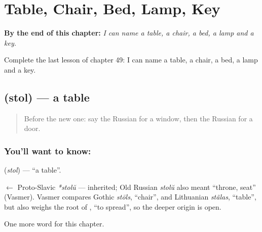 
\chapter{Table, Chair, Bed, Lamp, Key}
\label{ch:ru-table-chair-bed-lamp-key}

\begin{chapteropening}
\textbf{By the end of this chapter:} \emph{I can name a table, a chair, a bed, a lamp and a key.}

Complete the last lesson of chapter 49: I can name a table, a chair, a bed, a lamp and a key.
\end{chapteropening}

\section[\texorpdfstring{\ru{стол} (stol)}{стол (stol)}]{ (stol) — a table}

\label{lesson:RU-C49-table}



\begin{quote}
Before the new one: say the Russian for a window, then the Russian for a door.
\end{quote}

\subsection*{You'll want to know: }
\textbf{} (\emph{stol}) — \textquotedblleft{}a table\textquotedblright{}.

\begin{cousinweb}
\textbf{} $\leftarrow$ Proto-Slavic \emph{*stolŭ} — inherited; Old Russian \emph{stolŭ} also meant \textquotedblleft{}throne, seat\textquotedblright{} (Vasmer). Vasmer compares Gothic \emph{stōls}, \textquotedblleft{}chair\textquotedblright{}, and Lithuanian \emph{stãlas}, \textquotedblleft{}table\textquotedblright{}, but also weighs the root of \emph{}, \textquotedblleft{}to spread\textquotedblright{}, so the deeper origin is open.
\end{cousinweb}

\begin{grammarlens}[title={What you've built}]
One more word for this chapter.
\end{grammarlens}

